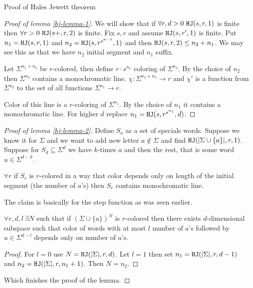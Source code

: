 \begin{topic}{Proof of Hales Jewett theorem}
	\begin{proof}[Proof of lemma \ref{hj-lemma-1}]
		We will show that if $\forall r, d > 0 \ \mathtt{HJ}(s,r,1)$ is finite then $\forall r > 0 \ \mathtt{HJ}(s+, r, 2)$ is finite. Fix $s, r$ and assume $\mathtt{HJ}(s, r', 1)$ is finite. Put $n_1 = \mathtt{HJ}(s,r,1)$ and $n_2 = \mathtt{HJ}(s, r^{s^{n-1}}, 1)$ and then $\mathtt{HJ}(s,r,2) \leq n_2 + n_1$. We may see this as that we have $n_2$ initial segment and $n_1$ suffix.
		
		Let $\Sigma^{n_1 + n_2}$ be $r$-colored, then define $r \cdot s^{n_1}$ coloring of $\Sigma^{n_2}$. By the choice of $n_2$ then $\Sigma^{n_2}$ contains a monochromatic line. $\chi : \Sigma^{n_2 + n_1} \to r$ and $\chi'$ is a function from $\Sigma^{n_2}$ to the set of all functions $\Sigma^{n_1} \to r$.
		
		Color of this line is a $r$-coloring of $\Sigma^{n_1}$. By the choice of $n_1$ it contains a monochromatic line. For higher $d$ replace $n_1 = \mathtt{HJ}(s, r^{s^{n_1}}, d)$.
	\end{proof}

	\begin{proof}[Proof of lemma \ref{hj-lemma-2}]
		Define $S_a$ as a set of specials words. Suppose we know it for $\Sigma$ and we want to add new letter $a \notin \Sigma$ and find $\mathtt{HJ}(|\Sigma \cup \{a\}|, r, 1)$. Suppose for $S_d \subseteq \Sigma^d$ we have $k$-times $a$ and then the rest, that is some word $u \in \Sigma^{d-k}$.
		
		\begin{claim}
			$\forall r$ if $S_r$ is $r$-colored in a way that color depends only on length of the initial segment (the number of $a$'s) then $S_r$ contains monochromatic line.
		\end{claim}
	
		The claim is basically for the step function as was seen earlier.
		
		\begin{claim}
			$\forall r, d, l \ \exists N$ such that if $(\Sigma \cup \{a\})^N$ is $r$-colored then there exists $d$-dimensional subspace such that color of words with at most $l$ number of $a$'s followed by $u \in \Sigma^{d-l}$ depends only on number of $a$'s.
		\end{claim}
	
		\begin{proof}
			For $l = 0$ use $N = \mathtt{HJ}(|\Sigma|, r, d)$. Let $l = 1$ then set $n_1 = \mathtt{HJ}(|\Sigma|, r, d-1)$ and $n_2 = \mathtt{HJ}(|\Sigma|, r, n_1 + 1)$. Then $N = n_2$.
		\end{proof}
	
		Which finishes the proof of the lemma.
	\end{proof}
\end{topic}

